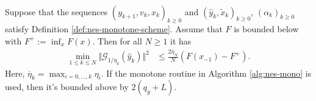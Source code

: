 \documentclass[12pt]{report}
\begin{document}
        \begin{theorem}\;\label{thm:nes-mono-wcnvx-convergence}\\
            Suppose that the sequences $(y_{k + 1}, v_k, x_k)_{k \ge 0}$ and $(\hat y_k, \tilde x_k)_{k \ge 0}$, $(\alpha_k)_{k \ge 0}$ satisfy Definition \ref{def:nes-monotone-scheme}. 
            Assume that $F$ is bounded below with $F^+ := \inf_{x}F(x)$. 
            Then for all $N \ge 1$ it has
            \begin{align*}
                \min_{1 \le k \le N}\Vert \mathcal G_{1/\eta_k}(\hat y_k) \Vert^2 
                &\le\frac{2\overline \eta_N}{N}(F(x_{-1}) - F^+). 
            \end{align*}
            Here, $\overline \eta_k = \max_{i = 0, \ldots, k}\eta_i$. 
            If the monotone routine in Algorithm \ref{alg:nes-mono} is used, then it's bounded above by $2(q_g + L)$. 
        \end{theorem}
\end{document}
